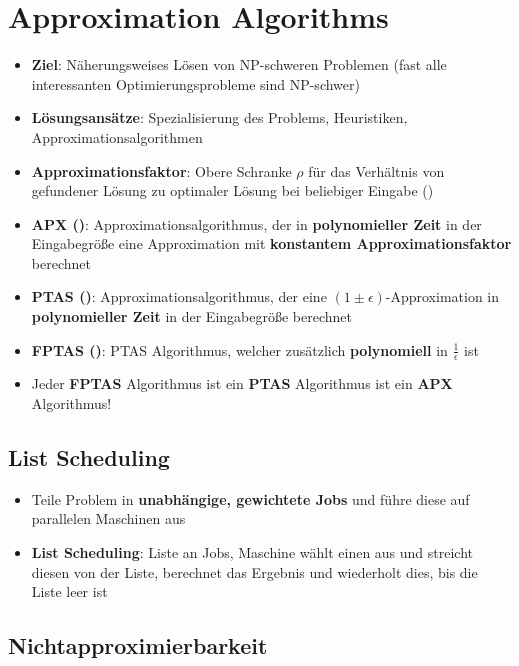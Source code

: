 \section{Approximation Algorithms}%
\label{aa:sec:approximation_algorithms}

\begin{itemize}
	\item \textbf{Ziel}: Näherungsweises Lösen von NP-schweren Problemen (fast alle interessanten Optimierungsprobleme sind NP-schwer)
	\item \textbf{Lösungsansätze}: Spezialisierung des Problems, Heuristiken, Approximationsalgorithmen
	\item \textbf{Approximationsfaktor}: Obere Schranke $\rho$ für das Verhältnis von gefundener Lösung zu optimaler Lösung bei beliebiger Eingabe ()
	\item \textbf{APX ()}: Approximationsalgorithmus, der in \textbf{polynomieller Zeit} in der Eingabegröße eine Approximation mit \textbf{konstantem Approximationsfaktor} berechnet
	\item \textbf{PTAS ()}: Approximationsalgorithmus, der eine $(1 \pm \epsilon)$-Approximation in \textbf{polynomieller Zeit} in der Eingabegröße berechnet
	\item \textbf{FPTAS ()}: PTAS Algorithmus, welcher zusätzlich \textbf{polynomiell} in $\frac{1}{\epsilon}$ ist
	\item Jeder \textbf{FPTAS} Algorithmus ist ein \textbf{PTAS} Algorithmus ist ein \textbf{APX} Algorithmus!
\end{itemize}

\subsection{List Scheduling}%
\label{aa:sub:list_scheduling}

\begin{itemize}
	\item Teile Problem in \textbf{unabhängige, gewichtete Jobs} und führe diese auf parallelen Maschinen aus
	\item \textbf{List Scheduling}: Liste an Jobs, Maschine wählt einen aus und streicht diesen von der Liste, berechnet das Ergebnis und wiederholt dies, bis die Liste leer ist
\end{itemize}

\subsection{Nichtapproximierbarkeit}%
\label{aa:sub:nichtapproximierbarkeit}

